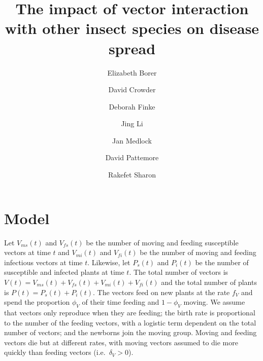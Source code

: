 \documentclass{article}
\title{The impact of vector interaction with other insect species on
  disease spread}
\author{
  Elizabeth Borer
  \and
  David Crowder
  \and
  Deborah Finke
  \and
  Jing Li
  \and
  Jan Medlock
  \and
  David Pattemore
  \and
  Rakefet Sharon
}
\begin{document}
\maketitle

\section{Model}

Let $V_{ms}(t)$ and $V_{fs}(t)$ be the number of moving and feeding
susceptible vectors at time $t$ and $V_{mi}(t)$ and $V_{fi}(t)$ be the
number of moving and feeding infectious vectors at time $t$.
Likewise, let $P_s(t)$ and $P_i(t)$ be the number of susceptible and
infected plants at time $t$.  The total number of vectors is $V(t) =
V_{ms}(t) + V_{fs}(t) + V_{mi}(t) + V_{fi}(t)$ and the total number of
plants is $P(t) = P_s(t) + P_i(t)$.  The vectors feed on new plants at
the rate $f_V$ and spend the proportion $\phi_V$ of their time feeding
and $1 - \phi_V$ moving.  We assume that vectors only reproduce when
they are feeding; the birth rate is proportional to the number of the
feeding vectors, with a logistic term dependent on the total number of
vectors; and the newborns join the moving group.  Moving and feeding
vectors die but at different rates, with moving vectors assumed to die
more quickly than feeding vectors (i.e.~$\delta_V > 0$).
\end{document}
